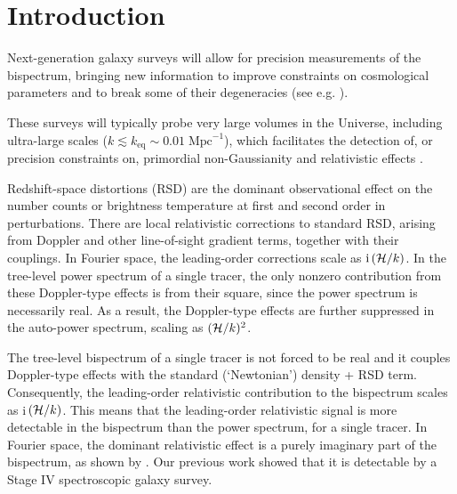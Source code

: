 \section{Introduction}
%
{Next-generation galaxy surveys will allow for precision measurements of the  bispectrum, bringing new information to improve constraints on cosmological parameters and to break some of their degeneracies (see e.g. \cite{Scoccimarro:2015bla,Tellarini:2016sgp, Gil-Marin:2016wya,  Slepian:2016kfz,Gagrani:2016rfy, Sugiyama:2018yzo,Desjacques:2018pfv,Child:2018klv, Yankelevich:2018uaz, Schmit:2018rtf,DiDio:2018unb,Gualdi:2019ybt,Sarkar:2019ojl,Chudaykin:2019ock,Oddo:2019run, Sugiyama:2019ike,Philcox:2019hdi,Durrer:2020orn,Montanari:2020uez}). 

These surveys will typically probe very large volumes in the Universe, including ultra-large scales ($k\lesssim k_{\mathrm{eq}} \sim 0.01\;\mathrm{Mpc}^{-1}$), which facilitates the detection of, or precision constraints on, primordial non-Gaussianity \cite{Tellarini:2015faa,Watkinson:2017zbs,Majumdar:2017tdm,Karagiannis:2018jdt,Karagiannis:2019jjx,Bharadwaj:2020wkc}
and relativistic effects
\cite{Kehagias:2015tda,Umeh:2016nuh, DiDio:2016gpd, Jolicoeur:2017nyt,Bertacca:2017dzm,Jolicoeur:2017eyi,Koyama:2018ttg,Clarkson:2018dwn,Maartens:2019yhx,Jeong:2019igb}.
 
Redshift-space distortions (RSD) are the dominant observational effect on the number counts or brightness temperature at first and second order in perturbations. There are local relativistic corrections to standard RSD, arising from Doppler and other line-of-sight gradient terms, together with their couplings.  In Fourier space, the leading-order corrections  scale as $\mathrm{i\,}(\mathcal{H}/k)$. In the tree-level power spectrum of a single tracer, the only nonzero contribution from these Doppler-type effects is from their square, since the power spectrum is necessarily real. As a result, the Doppler-type effects are further suppressed in the auto-power spectrum, scaling as  $(\mathcal{H}/k)^2$. 

The tree-level bispectrum of a single tracer is not forced to be real and it couples Doppler-type effects with the standard (`Newtonian') density + RSD term. Consequently, the leading-order relativistic contribution to the bispectrum scales as i\,$(\mathcal{H}/k)$. 
This means that the leading-order relativistic signal is more detectable in the bispectrum than the power spectrum, for a single tracer.
In Fourier space, the dominant relativistic effect is a purely imaginary part of the bispectrum, as shown by \cite{Clarkson:2018dwn,Maartens:2019yhx}. Our previous work \cite{Maartens:2019yhx} showed that it is detectable by a Stage IV spectroscopic galaxy survey.

}
